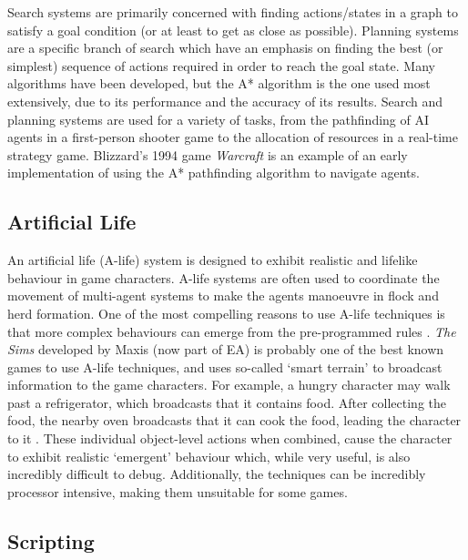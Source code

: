 \documentclass[a4paper,oneside]{report}
\begin{document}
Search systems are primarily concerned with finding actions/states in a graph to satisfy a goal condition (or at least to get as close as possible). Planning systems are a specific branch of search which have an emphasis on finding the best (or simplest) sequence of actions required in order to reach the goal state. Many algorithms have been developed, but the A* algorithm is the one used most extensively, due to its performance and the accuracy of its results. Search and planning systems are used for a variety of tasks, from the pathfinding of AI agents in a first-person shooter game to the allocation of resources in a real-time strategy game. Blizzard's 1994 game \emph{Warcraft} is an example of an early implementation of using the A* pathfinding algorithm to navigate agents.

\subsection{Artificial Life} 

An artificial life (A-life) system is designed to exhibit realistic and lifelike behaviour in game characters. A-life systems are often used to coordinate the movement of multi-agent systems to make the agents manoeuvre in flock and herd formation. One of the most compelling reasons to use A-life techniques is that more complex behaviours can emerge from the pre-programmed rules \cite{Woodcock:bs}. \emph{The Sims} developed by Maxis (now part of EA) is probably one of the best known games to use A-life techniques, and uses so-called `smart terrain' to broadcast information to the game characters. For example, a hungry character may walk past a refrigerator, which broadcasts that it contains food. After collecting the food, the nearby oven broadcasts that it can cook the food, leading the character to it \cite{Woodcock:bs}. These individual object-level actions when combined, cause the character to exhibit realistic `emergent' behaviour which, while very useful, is also incredibly difficult to debug. Additionally, the techniques can be incredibly processor intensive, making them unsuitable for some games. 

\subsection{Scripting} 
\end{document}
